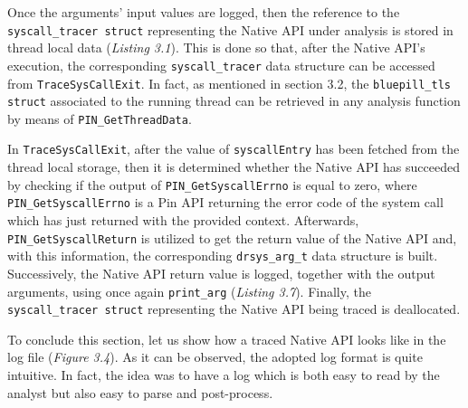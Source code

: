 Once the arguments' input values are logged, then the reference to the \texttt{syscall\_tracer struct} representing the Native API under analysis is stored in thread local data (\textit{Listing 3.1}). This is done so that, after the Native API's execution, the corresponding \texttt{syscall\_tracer} data structure can be accessed from \texttt{TraceSysCallExit}. In fact, as mentioned in section 3.2, the \texttt{bluepill\_tls struct} associated to the running thread can be retrieved in any analysis function by means of \texttt{PIN\_GetThreadData}.

In \texttt{TraceSysCallExit}, after the value of \texttt{syscallEntry} has been fetched from the thread local storage, then it is determined whether the Native API has succeeded by checking if the output of \texttt{PIN\_GetSyscallErrno} is equal to zero, where \texttt{PIN\_GetSyscallErrno} is a Pin API returning the error code of the system call which has just returned with the provided context. Afterwards, \texttt{PIN\_GetSyscallReturn} is utilized to get the return value of the Native API and, with this information, the corresponding \texttt{drsys\_arg\_t} data structure is built. Successively, the Native API return value is logged, together with the output arguments, using once again \texttt{print\_arg} (\textit{Listing 3.7}). Finally, the \texttt{syscall\_tracer struct} representing the Native API being traced is deallocated.

To conclude this section, let us show how a traced Native API looks like in the log file (\textit{Figure 3.4}). As it can be observed, the adopted log format is quite intuitive. In fact, the idea was to have a log which is both easy to read by the analyst but also easy to parse and post-process.      
\\

